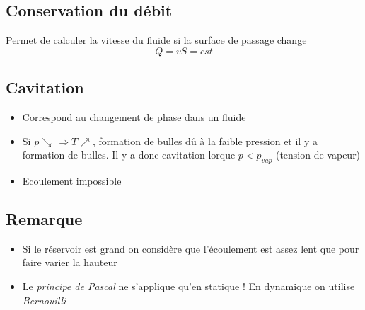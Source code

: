 \subsection*{Conservation du débit}
Permet de calculer la vitesse du fluide si la surface de passage change 
\begin{equation}
	Q = vS = cst
\end{equation}

\subsection*{Cavitation}
\begin{itemize}
	\item Correspond au changement de phase dans un fluide
	\item Si $p \searrow \, \Rightarrow T \nearrow$, formation de bulles dû à la faible pression et il y a formation de bulles. Il y a donc cavitation lorque $p < p_{vap}$ (tension de vapeur)
	\item Ecoulement impossible
\end{itemize}

\subsection*{Remarque}
\begin{itemize}
	\item Si le réservoir est grand on considère que l'écoulement est assez lent que pour faire varier la hauteur
	\item Le \textit{principe de Pascal} ne s'applique qu'en statique ! En dynamique on utilise \textit{Bernouilli}
\end{itemize}

